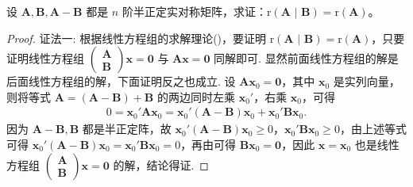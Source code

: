 \documentclass[../../main.tex]{subfiles}%
\begin{document}
\begin{proposition}\label{proposition:例8.76}
设 $\boldsymbol{A},\boldsymbol{B},\boldsymbol{A}-\boldsymbol{B}$ 都是 $n$ 阶半正定实对称矩阵，求证：$\mathrm{r}\left( \boldsymbol{A}\,\,|\,\,\boldsymbol{B} \right) =\mathrm{r}(\boldsymbol{A})$。
\end{proposition}
\begin{proof}

{\color{blue}证法一:}
根据线性方程组的求解理论()，要证明 $\mathrm{r}\left( \boldsymbol{A}\,\,|\,\,\boldsymbol{B} \right) =\mathrm{r}(\boldsymbol{A})$，只要证明线性方程组 $\begin{pmatrix}
\boldsymbol{A} \\
\boldsymbol{B}
\end{pmatrix}\boldsymbol{x}=\boldsymbol{0}$ 与 $\boldsymbol{A}\boldsymbol{x}=\boldsymbol{0}$ 同解即可. 显然前面线性方程组的解是后面线性方程组的解，下面证明反之也成立. 设 $\boldsymbol{A}\boldsymbol{x}_0=\boldsymbol{0}$，其中 $\boldsymbol{x}_0$ 是实列向量，则将等式 $\boldsymbol{A}=(\boldsymbol{A}-\boldsymbol{B})+\boldsymbol{B}$ 的两边同时左乘 $\boldsymbol{x}_0'$，右乘 $\boldsymbol{x}_0$，可得
\begin{align*}
0=\boldsymbol{x}_0'\boldsymbol{A}\boldsymbol{x}_0=\boldsymbol{x}_0'(\boldsymbol{A}-\boldsymbol{B})\boldsymbol{x}_0+\boldsymbol{x}_0'\boldsymbol{B}\boldsymbol{x}_0.
\end{align*}
因为 $\boldsymbol{A}-\boldsymbol{B},\boldsymbol{B}$ 都是半正定阵，故 $\boldsymbol{x}_0'(\boldsymbol{A}-\boldsymbol{B})\boldsymbol{x}_0\geqslant 0$，$\boldsymbol{x}_0'\boldsymbol{B}\boldsymbol{x}_0\geqslant 0$，由上述等式可得 $\boldsymbol{x}_0'(\boldsymbol{A}-\boldsymbol{B})\boldsymbol{x}_0=\boldsymbol{x}_0'\boldsymbol{B}\boldsymbol{x}_0 = 0$，再由可得 $\boldsymbol{B}\boldsymbol{x}_0=\boldsymbol{0}$，因此 $\boldsymbol{x}=\boldsymbol{x}_0$ 也是线性方程组 $\begin{pmatrix}
\boldsymbol{A} \\
\boldsymbol{B}
\end{pmatrix}\boldsymbol{x}=\boldsymbol{0}$ 的解，结论得证.


\end{proof}
\end{document}
